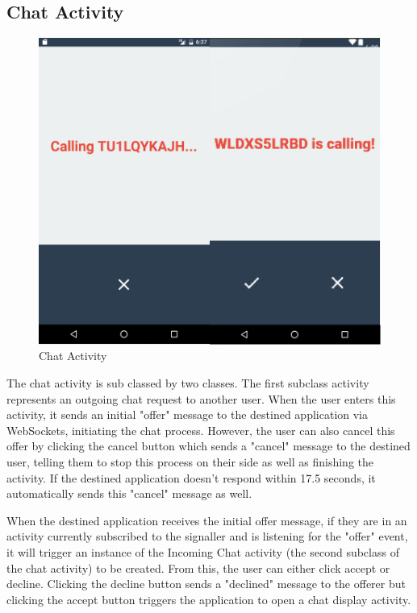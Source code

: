 \documentclass[]{report}
\begin{document}
		\subsection{Chat Activity}
			\begin{figure}[H]
				\caption{Chat Activity}
				\centering
				\includegraphics[scale=0.35]{ChatActivity.png}
			\end{figure}
		The chat activity is sub classed by two classes. The first subclass activity represents an outgoing chat request to another user. When the user enters this activity, it sends an initial "offer" message to the destined application via WebSockets, initiating the chat process. However, the user can also cancel this offer by clicking the cancel button which sends a "cancel" message to the destined user, telling them to stop this process on their side as well as finishing the activity. If the destined application doesn't respond within 17.5 seconds, it automatically sends this "cancel" message as well.
		
		When the destined application receives the initial offer message, if they are in an activity currently subscribed to the signaller and is listening for the "offer" event, it will trigger an instance of the Incoming Chat activity (the second subclass of the chat activity) to be created. From this, the user can either click accept or decline. Clicking the decline button sends a "declined" message to the offerer but clicking the accept button triggers the application to open a chat display activity.
		
\end{document}
